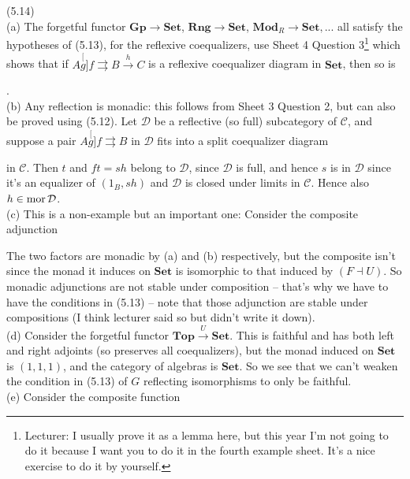 \documentclass[a4paper]{article}
\begin{document}
\begin{eg} (5.14)\\
    (a) The forgetful functor $\mathbf{Gp} \to \mathbf{Set}$, $\mathbf{Rng} \to \mathbf{Set}$, $\mathbf{Mod}_R \to \mathbf{Set}, ...$ all satisfy the hypotheses of (5.13), for the reflexive coequalizers, use Sheet 4 Question 3\footnote{Lecturer: I usually prove it as a lemma here, but this year I'm not going to do it because I want you to do it in the fourth example sheet. It's a nice exercise to do it by yourself.} which shows that if $A \stackrel[g]{f}{\rightrightarrows} B \xrightarrow{h} C$ is a reflexive coequalizer diagram in $\mathbf{Set}$, then so is 
    .\\
    (b) Any reflection is monadic: this follows from Sheet 3 Question 2, but can also be proved using (5.12). Let $\mathcal{D}$ be a reflective (so full) subcategory of $\mathcal{C}$, and suppose a pair $A \stackrel[g]{f}{\rightrightarrows} B$ in $\mathcal{D}$ fits into a split coequalizer diagram
    in $\mathcal{C}$. Then $t$ and $ft=sh$ belong to $\mathcal{D}$, since $\mathcal{D}$ is full, and hence $s$ is in $\mathcal{D}$ since it's an equalizer of $(1_B,sh)$ and $\mathcal{D}$ is closed under limits in $\mathcal{C}$. Hence also $h \in \operatorname{mor}\mathcal{D}$.\\
    (c) This is a non-example but an important one: Consider the composite adjunction


    The two factors are monadic by (a) and (b) respectively, but the composite isn't since the monad it induces on $\mathbf{Set}$ is isomorphic to that induced by $(F \dashv U)$. So monadic adjunctions are not stable under composition -- that's why we have to have the conditions in (5.13) -- note that those adjunction are stable under compositions (I think lecturer said so but didn't write it down).\\
    (d) Consider the forgetful functor $\mathbf{Top} \xrightarrow{U} \mathbf{Set}$. This is faithful and has both left and right adjoints (so preserves all coequalizers), but the monad induced on $\mathbf{Set}$ is $(1,1,1)$, and the category of algebras is $\mathbf{Set}$. So we see that we can't weaken the condition in (5.13) of $G$ reflecting isomorphisms to only be faithful.\\
    (e) Consider the composite function


\end{eg}
\end{document}
